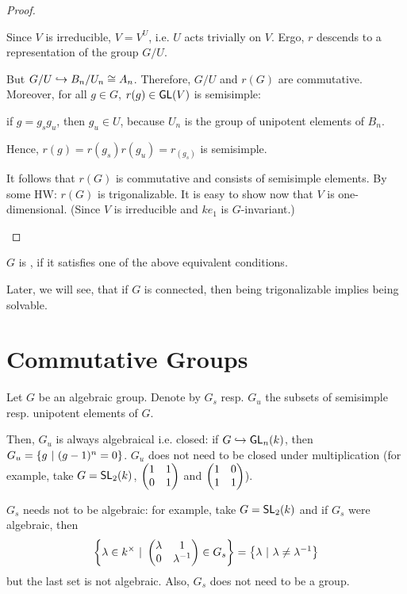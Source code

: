 \begin{proof}
\begin{enumerate}
Since $V$ is irreducible, $V = V^U$, i.e. $U$ acts trivially on $V$. Ergo, $r$ descends to a representation of the group $G/U$.

But $G/U \overset{}{\hookrightarrow} B_n / U_n \overset{}{\cong} A_n$. Therefore, $G/U$ and $r(G)$ are commutative. Moreover, for all $g \in G$, $r(g) \in \textsf{GL}(V)$ is semisimple:

if $g = g_sg_u$, then $g_u \in U$, because $U_n$ is the group of unipotent elements of $B_n$.

Hence, $r(g) = r(g_s) r(g_u) = r_(g_s)$ is semisimple.

It follows that $r(G)$ is commutative and consists of semisimple elements. By some HW: $r(G)$ is trigonalizable. It is easy to show now that $V$ is one-dimensional. (Since $V$ is irreducible and $ke_1$ is $G$-invariant.)
\end{enumerate}
\end{proof}
\begin{definition}
	$G$ is , if it satisfies one of the above equivalent conditions.
\end{definition}
	Later, we will see, that if $G$ is connected, then being trigonalizable implies being solvable.
	
\newpage	
\section{Commutative Groups}
Let $G$ be an algebraic group. Denote by $G_s$ resp. $G_u$ the subsets of semisimple resp. unipotent elements of $G$.

Then, $G_u$ is always algebraical i.e. closed: if $G \overset{}{\hookrightarrow} \textsf{GL}_n(k)$, then $G_u = \left\lbrace g ~ | ~ (g-1)^n = 0\right\rbrace$.
$G_u$ does not need to be closed under multiplication (for example, take $G = \textsf{SL}_2(k)$, $\left(\begin{matrix} 1 & 1 \\ 0 & 1 \end{matrix}\right)$ and $\left(\begin{matrix} 1 & 0\\ 1 & 1 \end{matrix}\right)$).

$G_s$ needs not to be algebraic: for example, take $G = \textsf{SL}_2(k)$ and if $G_s$ were algebraic, then
\[ \left\lbrace\lambda \in k^\times ~ | ~ 
\left(\begin{matrix} \lambda & 1\\ 0 & \lambda^{-1} \end{matrix}\right) \in G_s
\right\rbrace = \left\lbrace \lambda ~ | ~ \lambda \neq \lambda^{-1}\right\rbrace \]
but the last set is not algebraic. Also, $G_s$ does not need to be a group.